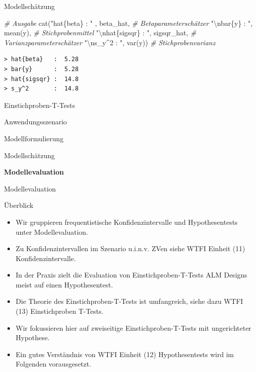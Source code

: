 \documentclass[
  8pt,
  ignorenonframetext,
]{beamer}
\newenvironment{Shaded}{\begin{snugshade}}{\end{snugshade}}
\newcommand{\CommentTok}[1]{\textcolor[rgb]{0.56,0.35,0.01}{\textit{#1}}}
\newcommand{\FunctionTok}[1]{\textcolor[rgb]{0.00,0.00,0.00}{#1}}
\newcommand{\NormalTok}[1]{#1}
\newcommand{\SpecialCharTok}[1]{\textcolor[rgb]{0.00,0.00,0.00}{#1}}
\newcommand{\StringTok}[1]{\textcolor[rgb]{0.31,0.60,0.02}{#1}}
\providecommand{\tightlist}{%
  \setlength{\itemsep}{0pt}\setlength{\parskip}{0pt}}
\begin{document}
\begin{frame}[fragile]{Modellschätzung}
\begin{Shaded}
\begin{Highlighting}[]
\CommentTok{\# Ausgabe}
\FunctionTok{cat}\NormalTok{(}\StringTok{"hat\{beta\}   : "}\NormalTok{  , beta\_hat,                                   }\CommentTok{\# Betaparameterschätzer}
    \StringTok{"}\SpecialCharTok{\textbackslash{}n}\StringTok{bar\{y\}      : "}\NormalTok{, }\FunctionTok{mean}\NormalTok{(y),                                    }\CommentTok{\# Stichprobenmittel}
    \StringTok{"}\SpecialCharTok{\textbackslash{}n}\StringTok{hat\{sigsqr\} : "}\NormalTok{, sigsqr\_hat,                                 }\CommentTok{\# Varianzparameterschätzer}
    \StringTok{"}\SpecialCharTok{\textbackslash{}n}\StringTok{s\_y\^{}2       : "}\NormalTok{, }\FunctionTok{var}\NormalTok{(y))                                     }\CommentTok{\# Stichprobenvarianz}
\end{Highlighting}
\end{Shaded}

\begin{verbatim}
> hat{beta}   :  5.28 
> bar{y}      :  5.28 
> hat{sigsqr} :  14.8 
> s_y^2       :  14.8
\end{verbatim}
\end{frame}

\begin{frame}{Einstichproben-T-Tests}
\protect\hypertarget{einstichproben-t-tests-4}{}
\large
{}
\vfill

Anwendungsszenario

Modellformulierung

Modellschätzung

\textbf{Modellevaluation} \vfill
\end{frame}

\begin{frame}{Modellevaluation}
\protect\hypertarget{modellevaluation}{}

Überblick

\footnotesize

\begin{itemize}
\tightlist
\item
  Wir gruppieren frequentistische Konfidenzintervalle und
  Hypothesentests unter Modellevaluation.
\item
  Zu Konfidenzintervallen im Szenario u.i.n.v. ZVen siehe WTFI Einheit
  (11) Konfidenzintervalle.
\item
  In der Praxis zielt die Evaluation von Einstichproben-T-Tests ALM
  Designs meist auf einen Hypothesentest.
\item
  Die Theorie des Einstichproben-T-Tests ist umfangreich, siehe dazu
  WTFI (13) Einstichproben T-Tests.
\item
  Wir fokussieren hier auf zweiseitige Einstichproben-T-Tests mit
  ungerichteter Hypothese.
\item
  Ein gutes Verständnis von WTFI Einheit (12) Hypothesentests wird im
  Folgenden vorausgesetzt.
\end{itemize}
\end{frame}
\end{document}
